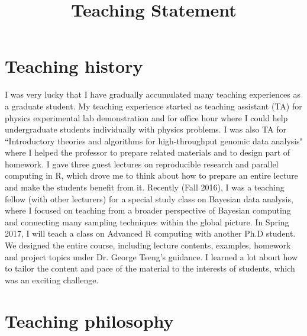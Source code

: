 \documentclass[12pt]{amsart} \usepackage{amssymb}
\title[]{Teaching Statement}
\begin{document}
\maketitle
\thispagestyle{empty}

\section{Teaching history}

I was very lucky that I have gradually accumulated many teaching experiences as a graduate student.
My teaching experience started as teaching assistant (TA) for physics experimental lab demonstration 
and for office hour where I could help undergraduate students individually with physics problems.
I was also TA for ``Introductory theories and algorithms for high-throughput genomic data analysis"
where I helped the professor to prepare related materials and to design part of homework.
I gave three guest lectures on reproducible research and parallel computing in R,
which drove me to think about how to prepare an entire lecture and make the students benefit from it.
Recently (Fall 2016), 
I was a teaching fellow (with other lecturers) for a special study class on Bayesian data analysis,
where I focused on teaching from a broader perspective of Bayesian computing and connecting many sampling techniques within the global picture.
In Spring 2017, I will teach a class on Advanced R computing with another Ph.D student.
We designed the entire course, including lecture contents, examples, homework and project topics
under Dr. George Tseng's guidance. 
I learned a lot about how to tailor the content and pace of the material to the interests of students, 
which was an exciting challenge.

\section{Teaching philosophy}
\end{document}
